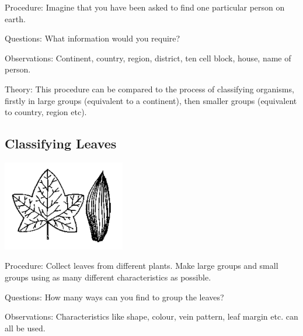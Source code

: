 \begin{multicols}{2}
\begin{description*}
\item[Procedure:]{Imagine that you have been asked to find one particular person on earth.}
\item[Questions:]{What information would you require?}
\item[Observations:]{Continent, country, region, district, ten cell block, house, name of person.}
\item[Theory:]{This procedure can be compared to the process of classifying organisms, firstly in large
groups (equivalent to a continent), then smaller groups (equivalent to country, region etc).}
\end{description*}

\subsection{Classifying Leaves} %

\begin{center}
\includegraphics[width=0.4\textwidth]{./img/source/classify-leaves.png}
\end{center}

\begin{description*}
\item[Procedure:]{Collect leaves from different plants. Make large groups and small groups using as many
different characteristics as possible.}
\item[Questions:]{How many ways can you find to group the leaves?}
\item[Observations:]{Characteristics like shape, colour, vein pattern, leaf margin etc. can all be used.}
\end{description*}


\end{multicols}
